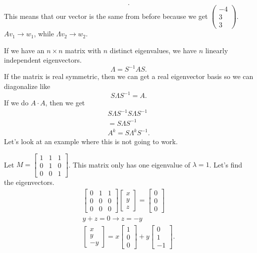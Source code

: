 \begin{eg}
\[  .\] 
  This means that our vector is the same from before because we get $\begin{pmatrix} -4\\3\\3 \end{pmatrix} $.\newline
  $Av_1\to w_1$, while $\Lambda v_2\to w_2$.
\end{eg}



If we have an $n\times n$ matrix with $n$ distinct eigenvalues, we have $n$ linearly independent eigenvectors. \[
\Lambda=S^{-1}AS
.\] 
If the matrix is real symmetric, then we can get a real eigenvector basis so we can diagonalize like \[
S\Lambda S^{-1}=A
.\] 
If we do $A\cdot A$, then we get 
\begin{align*}
  S\Lambda S^{-1}S\Lambda S^{-1}\\
  =S \Lambda S^{-1}\\
  A^{k}=S \Lambda ^{k}S^{-1}
.\end{align*}
Let's look at an example where this is not going to work. 
\begin{eg}
  Let $M=\begin{bmatrix} 1&1&1\\0&1&0\\0&0&1 \end{bmatrix} $. This matrix only has one eigenvalue of $\lambda=1$. Let's find the eigenvectors.
  \begin{align*}
    \begin{bmatrix} 0&1&1\\0&0&0\\0&0&0 \end{bmatrix} \begin{bmatrix} x\\y\\z \end{bmatrix} =\begin{bmatrix} 0\\0\\0 \end{bmatrix} \\
    y+z=0\to z=-y\\
    \begin{bmatrix} x\\y\\-y \end{bmatrix} =x\begin{bmatrix} 1\\0\\0 \end{bmatrix} +y\begin{bmatrix} 0\\1\\-1 \end{bmatrix} 
  .\end{align*}
\end{eg}
